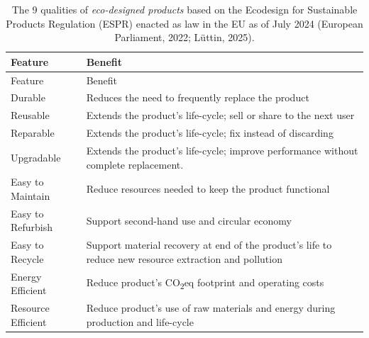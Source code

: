 \documentclass[
  12pt,
  letterpaper,
  DIV=11,
  numbers=noendperiod]{scrartcl}
\begin{document}
\begin{longtable}[]{@{}
  >{\raggedright\arraybackslash}p{}
  >{\raggedright\arraybackslash}p{}@{}}
\caption[The Qualities of *Eco-Designed Products*]{The 9 qualities of
\emph{eco-designed products} based on the Ecodesign for Sustainable
Products Regulation (ESPR) enacted as law in the EU as of July 2024
(European Parliament, 2022; Lüttin, 2025).}\tabularnewline
\toprule\noalign{}
\begin{minipage}[b]{\linewidth}\raggedright
Feature
\end{minipage} & \begin{minipage}[b]{\linewidth}\raggedright
Benefit
\end{minipage} \\
\midrule\noalign{}
\endfirsthead
\toprule\noalign{}
\begin{minipage}[b]{\linewidth}\raggedright
Feature
\end{minipage} & \begin{minipage}[b]{\linewidth}\raggedright
Benefit
\end{minipage} \\
\midrule\noalign{}
\endhead
\bottomrule\noalign{}
\endlastfoot
Durable & Reduces the need to frequently replace the product \\
Reusable & Extends the product's life-cycle; sell or share to the next
user \\
Reparable & Extends the product's life-cycle; fix instead of
discarding \\
Upgradable & Extends the product's life-cycle; improve performance
without complete replacement. \\
Easy to Maintain & Reduce resources needed to keep the product
functional \\
Easy to Refurbish & Support second-hand use and circular economy \\
Easy to Recycle & Support material recovery at end of the product's life
to reduce new resource extraction and pollution \\
Energy Efficient & Reduce product's CO\textsubscript{2}eq footprint and
operating costs \\
Resource Efficient & Reduce product's use of raw materials and energy
during production and life-cycle \\
\end{longtable}

\let\pandoctableshortcapt\relax
\end{document}
